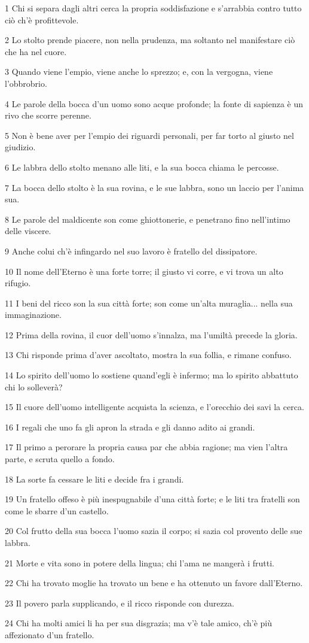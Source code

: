 \par 1 Chi si separa dagli altri cerca la propria soddisfazione e s'arrabbia contro tutto ciò ch'è profittevole.
\par 2 Lo stolto prende piacere, non nella prudenza, ma soltanto nel manifestare ciò che ha nel cuore.
\par 3 Quando viene l'empio, viene anche lo sprezzo; e, con la vergogna, viene l'obbrobrio.
\par 4 Le parole della bocca d'un uomo sono acque profonde; la fonte di sapienza è un rivo che scorre perenne.
\par 5 Non è bene aver per l'empio dei riguardi personali, per far torto al giusto nel giudizio.
\par 6 Le labbra dello stolto menano alle liti, e la sua bocca chiama le percosse.
\par 7 La bocca dello stolto è la sua rovina, e le sue labbra, sono un laccio per l'anima sua.
\par 8 Le parole del maldicente son come ghiottonerie, e penetrano fino nell'intimo delle viscere.
\par 9 Anche colui ch'è infingardo nel suo lavoro è fratello del dissipatore.
\par 10 Il nome dell'Eterno è una forte torre; il giusto vi corre, e vi trova un alto rifugio.
\par 11 I beni del ricco son la sua città forte; son come un'alta muraglia... nella sua immaginazione.
\par 12 Prima della rovina, il cuor dell'uomo s'innalza, ma l'umiltà precede la gloria.
\par 13 Chi risponde prima d'aver ascoltato, mostra la sua follia, e rimane confuso.
\par 14 Lo spirito dell'uomo lo sostiene quand'egli è infermo; ma lo spirito abbattuto chi lo solleverà?
\par 15 Il cuore dell'uomo intelligente acquista la scienza, e l'orecchio dei savi la cerca.
\par 16 I regali che uno fa gli apron la strada e gli danno adito ai grandi.
\par 17 Il primo a perorare la propria causa par che abbia ragione; ma vien l'altra parte, e scruta quello a fondo.
\par 18 La sorte fa cessare le liti e decide fra i grandi.
\par 19 Un fratello offeso è più inespugnabile d'una città forte; e le liti tra fratelli son come le sbarre d'un castello.
\par 20 Col frutto della sua bocca l'uomo sazia il corpo; si sazia col provento delle sue labbra.
\par 21 Morte e vita sono in potere della lingua; chi l'ama ne mangerà i frutti.
\par 22 Chi ha trovato moglie ha trovato un bene e ha ottenuto un favore dall'Eterno.
\par 23 Il povero parla supplicando, e il ricco risponde con durezza.
\par 24 Chi ha molti amici li ha per sua disgrazia; ma v'è tale amico, ch'è più affezionato d'un fratello.

